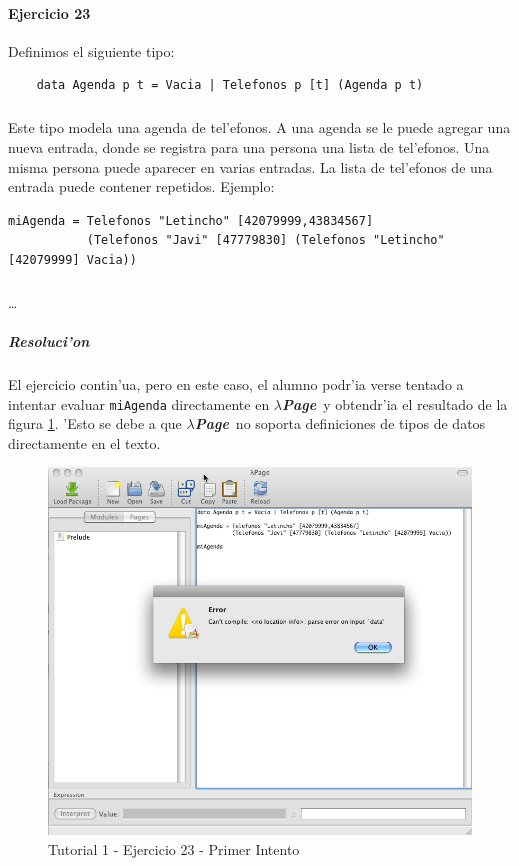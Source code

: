 \documentclass[a4paper]{article}
\newcommand{\hpage}{\textbf{\textsl{$\lambda$Page}}}
\begin{document}
\newpage
\paragraph{Ejercicio 23}Definimos el siguiente tipo:
\begin{lstlisting}
	data Agenda p t = Vacia | Telefonos p [t] (Agenda p t)
\end{lstlisting}
\subparagraph{}Este tipo modela una agenda de tel'efonos.  A una agenda se le puede agregar una nueva entrada, donde se registra para una persona una lista de tel'efonos.  Una misma persona puede aparecer en varias entradas.  La lista de tel'efonos de una entrada puede contener repetidos.  Ejemplo:
\begin{lstlisting}
miAgenda = Telefonos "Letincho" [42079999,43834567] 
           (Telefonos "Javi" [47779830] (Telefonos "Letincho" [42079999] Vacia)) 
\end{lstlisting}
\subparagraph{}\ldots
\subparagraph{Resoluci'on}El ejercicio contin'ua, pero en este caso, el alumno podr'ia verse tentado a intentar evaluar \texttt{miAgenda} directamente en \hpage\ y obtendr'ia el resultado de la figura \ref{tut109}.  'Esto se debe a que \hpage\ no soporta definiciones de tipos de datos directamente en el texto.
\begin{figure}[hp]
	\begin{center}
        	\includegraphics[width=.9\textwidth]{pictures/tut1/09}
		\caption{Tutorial 1 - Ejercicio 23 - Primer Intento}
		\label{tut109}
	\end{center}
\end{figure}
\end{document}

